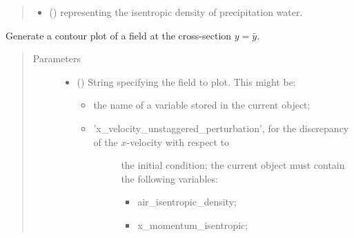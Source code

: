 \documentclass[letterpaper,10pt,english]{sphinxmanual}
\begin{document}
\begin{fulllineitems}
\begin{fulllineitems}
\begin{quote}
\begin{description}
\begin{itemize}
\item {} 
 () \textendash{}  representing the isentropic density of precipitation water.

\end{itemize}

\end{description}\end{quote}

\end{fulllineitems}


\begin{fulllineitems}
\label{\detokenize{api:storages.state_isentropic.StateIsentropic.contour_xz}}
Generate a contour plot of a field at the cross-section \(y = \bar{y}\).
\begin{quote}\begin{description}
\item[{Parameters}] \leavevmode\begin{itemize}
\item {} 
 () \textendash{} 
String specifying the field to plot. This might be:
\begin{itemize}
\item {} 
the name of a variable stored in the current object;

\item {} \begin{description}
\item[{’x\_velocity\_unstaggered\_perturbation’, for the discrepancy of the \(x\)-velocity with respect to}] \leavevmode
the initial condition; the current object must contain the following variables:
\begin{itemize}
\item {} 
air\_isentropic\_density;

\item {} 
x\_momentum\_isentropic;

\end{itemize}

\end{description}


\end{itemize}
\end{itemize}
\end{description}
\end{quote}
\end{fulllineitems}
\end{fulllineitems}
\end{document}

